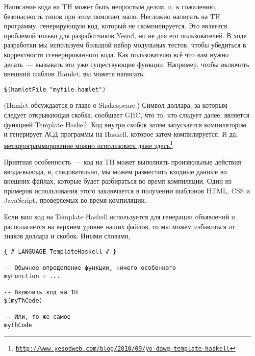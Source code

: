 
Написание кода на TH может быть непростым делом, и, к сожалению, безопасность типов при этом помогает мало. Несложно написать на TH программу, генерирующую код, который не скомпилируется. Это является проблемой только для разработчиков Yesod, но не для его пользователей. В ходе разработки мы используем большой набор модульных тестов, чтобы убедиться в корректности сгенерированного кода. Как пользователю всё что вам нужно делать~--- вызывать эти уже существующие функции. Например, чтобы включить внешний шаблон Hamlet, вы можете написать:

\begin{lstlisting}
$(hamletFile "myfile.hamlet")
\end{lstlisting}

(Hamlet обсуждается в главе о Shakespeare.) Символ доллара, за которым следует открывающая скобка, сообщает GHC, что то, что следует далее, является функцией Template Haskell. Код внутри скобок затем запускается компилятором и генерирует АСД программы на Haskell, которое затем компилируется. И да, \href{http://www.yesodweb.com/blog/2010/09/yo-dawg-template-haskell}{метапрограммирование можно использовать даже здесь}\footnote{\href{http://www.yesodweb.com/blog/2010/09/yo-dawg-template-haskell}{\texttt{http://www.yesodweb.com/blog/2010/09/yo-dawg-template-haskell}}}.

Приятная особенность~--- код на TH может выполнять произвольные действия ввода-вывода, и, следовательно, мы можем разместить входные данные во внешних файлах, которые будет разбираться во время компиляции. Один из примеров использования этого заключается в получении шаблонов HTML, CSS и JavaScript, проверяемых во время компиляции.

Если ваш код на Template Haskell используется для генерации объявлений и располагается на верхнем уровне наших файлов, то мы можем избавиться от знаков доллара и скобок. Иными словами,

\begin{lstlisting}
{-# LANGUAGE TemplateHaskell #-}

-- Обычное определение функции, ничего особенного
myFunction = ...

-- Включить код на TH
$(myThCode)

-- Или, то же самое
myThCode
\end{lstlisting}

